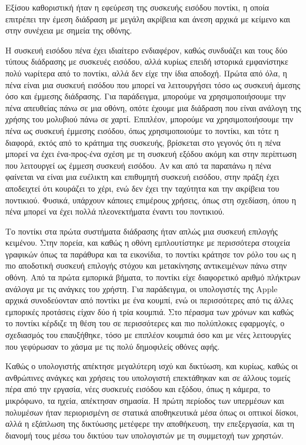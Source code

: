 \documentclass[
]{article}
\begin{document}
Εξίσου καθοριστική ήταν η εφεύρεση της συσκευής εισόδου ποντίκι, η οποία
επιτρέπει την έμεση διάδραση με μεγάλη ακρίβεια και άνεση αρχικά με
κείμενο και στην συνέχεια με σημεία της οθόνης.

Η συσκευή εισόδου πένα έχει ιδιαίτερο ενδιαφέρον, καθώς συνδυάζει και
τους δύο τύπους διάδρασης με συσκευές εισόδου, αλλά κυρίως επειδή
ιστορικά εμφανίστηκε πολύ νωρίτερα από το ποντίκι, αλλά δεν είχε την
ίδια αποδοχή. Πρώτα από όλα, η πένα είναι μια συσκευή εισόδου που μπορεί
να λειτουργήσει τόσο ως συσκευή άμεσης όσο και έμμεσης διάδρασης. Για
παράδειγμα, μπορούμε να χρησιμοποιήσουμε την πένα απευθείας πάνω σε μια
οθόνη, οπότε έχουμε μια διάδραση που είναι ανάλογη της χρήσης του
μολυβιού πάνω σε χαρτί. Επιπλέον, μπορούμε να χρησιμοποιήσουμε την πένα
ως συσκευή έμμεσης εισόδου, όπως χρησιμοποιούμε το ποντίκι, και τότε η
διαφορά, εκτός από το κράτημα της συσκευής, βρίσκεται στο γεγονός ότι η
πένα μπορεί να έχει ένα-προς-ένα σχέση με τη συσκευή εξόδου ακόμη και
στην περίπτωση που λειτουργεί ως έμμεση συσκευή εισόδου. Αν και από τα
παραπάνω η πένα φαίνεται να είναι μια ευέλικτη και επιθυμητή συσκευή
εισόδου, στην πράξη έχει αποδειχτεί ότι κουράζει το χέρι, ενώ δεν έχει
την ταχύτητα και την ακρίβεια του ποντικιού. Φυσικά, υπάρχουν κάποιες
επιμέρους χρήσεις, όπως στη σχεδίαση, όπου η πένα μπορεί να έχει πολλά
πλεονεκτήματα έναντι του ποντικιού.

Το ποντίκι στα πρώτα συστήματα διάδρασης ήταν απλώς μια συσκευή επιλογής
κειμένου. Στην πορεία, και καθώς η οθόνη εμπλουτίστηκε με περισσότερα
στοιχεία γραφικών όπως τα παράθυρα και τα εικονίδια, το ποντίκι κράτησε
τον ρόλο του ως η πιο αποδοτική συσκευή επιλογής στόχου και μετακίνησης
αντικειμένων πάνω στην οθόνη. Από τα πρώτα εμπορικά βήματα, το ποντίκι
είχε διαφορετικό αριθμό πλήκτρων ανάλογα με τις ανάγκες του χρήστη. Για
παράδειγμα, οι υπολογιστές της Apple αρχικά συνοδεύονταν από ποντίκι με
ένα κουμπί, ενώ οι περισσότερες από τις άλλες εμπορικές προτάσεις είχαν
δύο ή τρία κουμπιά. Στο πέρασμα των χρόνων και καθώς το ποντίκι κέρδιζε
τη θέση του σε περισσότερες και πιο πολύπλοκες εφαρμογές, ο σχεδιασμός
του επαυξήθηκε, τόσο με επιπλέον κουμπιά όσο και με νέες λειτουργίες που
γεφύρωσαν το χάσμα με τις πολύ δημοφιλείς οθόνες αφής.

Καθώς ο υπολογιστής απέκτησε μεγαλύτερη ισχύ και δικτύωση, και κυρίως,
καθώς οι ανθρώπινες ανάγκες και χρήσεις του υπολογιστή επεκτάθηκαν και
σε άλλους τομείς πέρα από την εργασία, νέες συσκευές εισόδου και εξόδου,
όπως η κάμερα, το μικρόφωνο, τα ηχεία, απέκτησαν σημασία. Η πρώτη
περίοδος των υπερμέσων και πολυμέσων ήταν περιορισμένη σε στατικά
αποθηκευτικά μέσα όπως οι οπτικοί δίσκοι, αλλά η εξάπλωση της δικτύωσης
μετέφερε την αποθήκευση, την επεξεργασία, και τη διανομή τους μέσω του
δικτύου των υπολογιστών με τη συμμετοχή των χρηστών.
\end{document}
